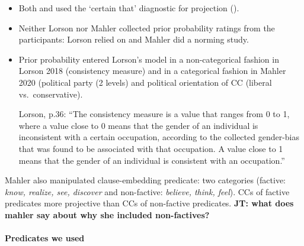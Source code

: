\documentclass[11pt,fleqn]{article}
\newcommand{\6}{\mbox{$[\hspace*{-.6mm}[$}}
\newcommand{\9}{\mbox{$]\hspace*{-.6mm}]$}}
\newcommand{\jt}[1]{\textbf{\color{blue}JT: #1}}
\begin{document}
\begin{itemize}

\item Both \citealt{lorson2018} and \citealt{mahler2020} used the `certain that' diagnostic for projection (\citealt{tbd-variability}).

\item Neither Lorson nor Mahler collected prior probability ratings from the participants: Lorson relied on \citealt{boyce-etal2018} and Mahler did a norming study.

\item Prior probability entered Lorson's model in a non-categorical fashion in Lorson 2018 (consistency measure) and in a categorical fashion in Mahler 2020 (political party (2 levels) and political orientation of CC (liberal vs.\ conservative). 

Lorson, p.36: ``The consistency measure is a value that ranges from 0 to 1, where a value close to 0 means that the gender of an individual is inconsistent with a certain occupation, according to the collected gender-bias that was found to be associated with that occupation. A value close to 1 means that the gender of an individual is consistent with an occupation.''

\end{itemize}

Mahler also manipulated clause-embedding predicate: two categories (factive: {\em know, realize, see, discover} and non-factive: {\em believe, think, feel}). CCs of factive predicates more projective than CCs of non-factive predicates. \jt{what does mahler say about why she included non-factives?}

\newpage

\paragraph{Predicates we used}
\end{document}
